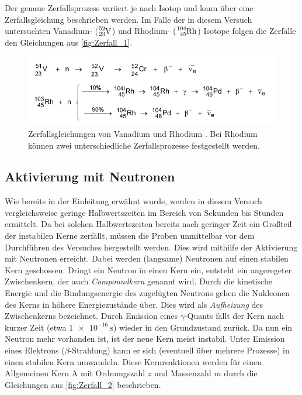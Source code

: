 Der genaue Zerfallsprozess variiert je nach Isotop und kann über eine Zerfallsgleichung beschrieben werden. Im Falle der in diesem Versuch untersuchten Vanadium- ($\ce{^{52}_{23}V}$)
und Rhodium- ($\ce{^{104}_{45}Rh}$) Isotope folgen die Zerfälle den Gleichungen aus \autoref{fig:Zerfall_1}.

\begin{figure}
    \centering
    \includegraphics[width = .7\textwidth]{content/Zerfall_1.png}
    \caption{Zerfallsgleichungen von Vanadium und Rhodium \cite{v702}. Bei Rhodium können zwei unterschiedliche Zerfallsprozesse festgestellt werden.}
    \label{fig:Zerfall_1}
\end{figure}

\subsection{Aktivierung mit Neutronen}
\label{subsec:Aktivierung}
Wie bereits in der Einleitung erwähnt wurde, werden in diesem Versuch vergleichsweise geringe Halbwertszeiten im Bereich von Sekunden bis Stunden ermittelt. Da bei solchen 
Halbwertszeiten bereits nach geringer Zeit ein Großteil der instabilen Kerne zerfällt, müssen die Proben unmittelbar vor dem Durchführen des Versuches hergestellt werden.
Dies wird mithilfe der Aktivierung mit Neutronen erreicht.
Dabei werden (langsame) Neutronen auf einen stabilen Kern geschossen. Dringt ein Neutron in einen Kern ein, entsteht ein angeregeter Zwischenkern, der auch \textit{Compoundkern}
genannt wird. Durch die kinetische Energie und die Bindungsenergie des zugefügten Neutrons gehen die Nukleonen des Kerns in höhere Energiezustände über. Dies wird als 
\textit{Aufheizung} des Zwischenkerns bezeichnet. Durch Emission eines $\gamma$-Quants fällt der Kern nach kurzer Zeit (etwa $\qty{1e-16}{\second}$) wieder in den Grundzustand 
zurück. Da nun ein Neutron mehr vorhanden ist, ist der neue Kern meist instabil. Unter Emission eines Elektrons ($\beta$-Strahlung) kann er sich (eventuell über mehrere Prozesse)
in einen stabilen Kern umwandeln. Diese Kernreaktionen werden für einen Allgemeinen Kern A mit Ordnungszahl $z$ und Massenzahl $m$ durch die Gleichungen aus 
\autoref{fig:Zerfall_2} beschrieben.

